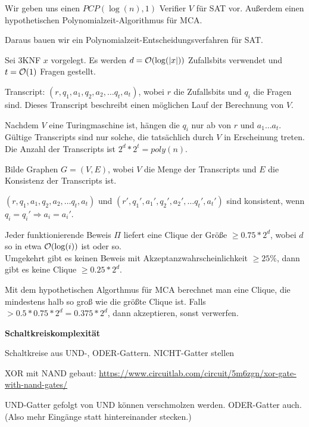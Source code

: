 \begin{beweis}
    Wir geben uns einen $\mathit{PCP}(\log(n), 1)$ Verifier $V$ für SAT vor.
    Außerdem einen hypothetischen Polynomialzeit-Algorithmus für MCA.

    Daraus bauen wir ein Polynomialzeit-Entscheidungsverfahren für SAT.

    Sei 3KNF $x$ vorgelegt.
    Es werden $d = \mathcal{O}(\log(|x|))$ Zufallsbits verwendet und $t = \mathcal{O}(1)$
    Fragen gestellt.

    Transcript:
    $(r, q_1, a_1, q_2, a_2, \dots q_t, a_t)$,
    wobei $r$ die Zufallsbits und $q_i$ die Fragen sind.
    Dieses Transcript beschreibt einen möglichen Lauf der Berechnung von $V$.

    Nachdem $V$ eine Turingmaschine ist, hängen die $q_i$ nur ab von $r$ und
    $a_1 \dots a_t$.
    Gültige Transcripts sind nur solche, die tatsächlich durch $V$ in
    Erscheinung treten.
    Die Anzahl der Transcripts ist $2^d * 2^t = poly(n)$.

    Bilde Graphen $G = (V, E)$, wobei $V$ die Menge der Transcripts und $E$ die
    Konsistenz der Transcripts ist.

    $(r, q_1, a_1, q_2, a_2, \dots q_t, a_t)$ und
    $(r', q_1', a_1', q_2', a_2', \dots q_t', a_t')$
    sind konsistent, wenn $q_i = q_i' \Rightarrow a_i = a_i'$.

    Jeder funktionierende Beweis $\Pi$ liefert eine Clique der Größe $\geq 0.75
    * 2^d$, wobei $d$ so in etwa $\mathcal{O}(\log(i))$ ist oder so.
    \\
    Umgekehrt gibt es keinen Beweis mit Akzeptanzwahrscheinlichkeit $\geq 25\%$,
    dann gibt es keine Clique $\geq 0.25 * 2^d$.

    Mit dem hypothetischen Algorthmus für MCA berechnet man eine Clique, die
    mindestens halb so groß wie die größte Clique ist.
    Falls $> 0.5 * 0.75 * 2^d = 0.375 * 2^d$, dann akzeptieren, sonst verwerfen.

\end{beweis}






\textbf{Schaltkreiskomplexität}

Schaltkreise aus UND-, ODER-Gattern. NICHT-Gatter stellen

XOR mit NAND gebaut:
\url{https://www.circuitlab.com/circuit/5m6zgn/xor-gate-with-nand-gates/}


UND-Gatter gefolgt von UND können verschmolzen werden. ODER-Gatter auch. (Also
mehr Eingänge statt hintereinander stecken.)

